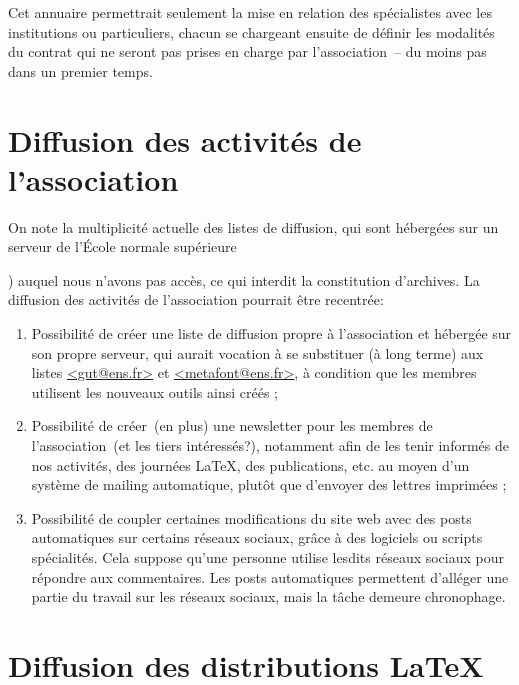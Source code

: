 \documentclass{tufte-handout}
\newcommand{\ratio}[3][]{\marginpar{\footnotesize{\textcolor{teal}{Temps requis: #2 / Utilité: #3}\par\noindent \textcolor{teal}{#1}}}}
\begin{document}
Cet annuaire permettrait seulement la mise en relation des spécialistes avec les institutions ou particuliers, chacun se chargeant ensuite de définir les modalités du contrat qui ne seront pas prises en charge par l'association~-- du moins pas dans un premier temps.


\section{Diffusion des activités de l'association}

On note la multiplicité actuelle des listes de diffusion, qui sont hébergées sur un serveur de l'École normale supérieure~{) auquel nous n'avons pas accès, ce qui interdit la constitution d'archives. La diffusion des activités de l'association pourrait être recentrée:

\begin{enumerate}
	\item Possibilité de créer\ratio[Simple, mais \emph{quid} de l'efficacité]{+}{+} une liste de diffusion propre à l'association et hébergée sur son propre serveur, qui aurait vocation à se substituer (à long terme) aux listes \url{<gut@ens.fr>} et \url{<metafont@ens.fr>}, à condition que les membres utilisent les nouveaux outils ainsi créés ;
	\item Possibilité de créer~(en plus) une newsletter\ratio[Simple et utile pour toucher davantage d'utilisateurs]{+}{++} pour les membres de l'association~(et les tiers intéressés?), notamment afin de les tenir informés de nos activités, des journées \LaTeX, des publications, etc. au moyen d'un système de mailing automatique, plutôt que d'envoyer des lettres imprimées ;
	\item Possibilité de coupler certaines modifications\ratio[Atteindre de nouveaux publics, mais ces médias correspondent-ils à notre philosophie?]{++}{+} du site web avec des posts automatiques sur certains réseaux sociaux, grâce à des logiciels ou scripts spécialités. Cela suppose qu'une personne utilise lesdits réseaux sociaux pour répondre aux commentaires. Les posts automatiques permettent d'alléger une partie du travail sur les réseaux sociaux, mais la tâche demeure chronophage.
\end{enumerate}


\section{Diffusion des distributions \LaTeX}

}
\end{document}
